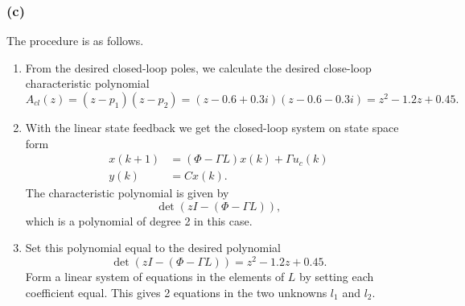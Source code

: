 \documentclass{scrartcl}
\begin{document}
\subsubsection*{(c)}
\label{sec:orgheadline19}
The procedure is as follows. 
\begin{enumerate}
\item From the desired closed-loop poles, we calculate the desired close-loop characteristic polynomial
\[ A_{cl}(z) = (z-p_1)(z - p_2) = (z-0.6+0.3i)(z-0.6-0.3i) = z^2 -1.2z + 0.45.\]
\item With the linear state feedback we get the closed-loop system on state space form
\begin{equation*}
 \begin{split}
 x(k+1) &= \left(\Phi - \Gamma L\right)x(k) + \Gamma u_c(k)\\
 y(k) &= C x(k).
 \end{split}
\end{equation*}
The characteristic polynomial is given by
\[ \det \left(zI - (\Phi - \Gamma L)\right), \]
which is a polynomial of degree 2 in this case.
\item Set this polynomial equal to the desired polynomial
\[ \det \left(zI - (\Phi - \Gamma L)\right) = z^2 - 1.2z + 0.45. \]
Form a linear system of equations in the elements of \(L\) by setting each coefficient equal. This gives 2 equations in the two unknowns \(l_1\) and \(l_2\).
\end{enumerate}
\end{document}
